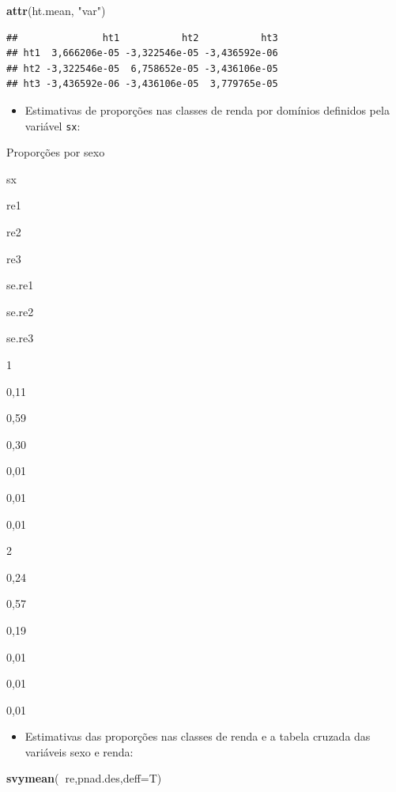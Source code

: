 \documentclass[]{book}
\newenvironment{Shaded}{\begin{snugshade}}{\end{snugshade}}
\newcommand{\KeywordTok}[1]{\textcolor[rgb]{0.13,0.29,0.53}{\textbf{#1}}}
\newcommand{\DataTypeTok}[1]{\textcolor[rgb]{0.13,0.29,0.53}{#1}}
\newcommand{\StringTok}[1]{\textcolor[rgb]{0.31,0.60,0.02}{#1}}
\newcommand{\OperatorTok}[1]{\textcolor[rgb]{0.81,0.36,0.00}{\textbf{#1}}}
\newcommand{\NormalTok}[1]{#1}
\providecommand{\tightlist}{%
  \setlength{\itemsep}{0pt}\setlength{\parskip}{0pt}}
\theoremstyle{definition}
\theoremstyle{definition}
\theoremstyle{definition}
\theoremstyle{remark}
\begin{document}
\begin{Shaded}
\begin{Highlighting}[]
\KeywordTok{attr}\NormalTok{(ht.mean, }\StringTok{"var"}\NormalTok{)}
\end{Highlighting}
\end{Shaded}

\begin{verbatim}
##               ht1           ht2           ht3
## ht1  3,666206e-05 -3,322546e-05 -3,436592e-06
## ht2 -3,322546e-05  6,758652e-05 -3,436106e-05
## ht3 -3,436592e-06 -3,436106e-05  3,779765e-05
\end{verbatim}

\begin{itemize}
\tightlist
\item
  Estimativas de proporções nas classes de renda por domínios definidos
  pela variável \texttt{sx}:
\end{itemize}

Proporções por sexo

sx

re1

re2

re3

se.re1

se.re2

se.re3

1

0,11

0,59

0,30

0,01

0,01

0,01

2

0,24

0,57

0,19

0,01

0,01

0,01

\begin{itemize}
\tightlist
\item
  Estimativas das proporções nas classes de renda e a tabela cruzada das
  variáveis sexo e renda:
\end{itemize}

\begin{Shaded}
\begin{Highlighting}[]
\KeywordTok{svymean}\NormalTok{(}\OperatorTok{~}\NormalTok{re,pnad.des,}\DataTypeTok{deff=}\NormalTok{T)}
\end{Highlighting}
\end{Shaded}
\end{document}
